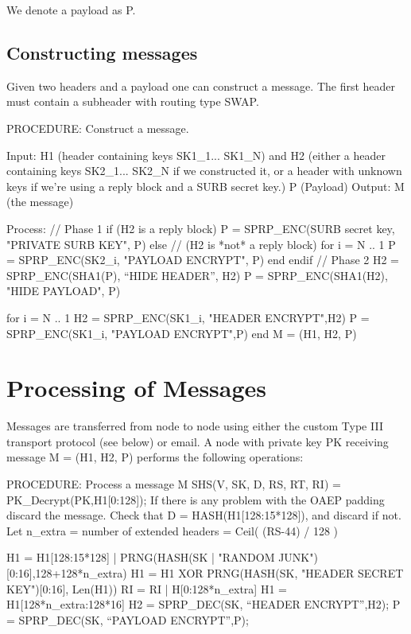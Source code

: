 We denote a payload as P.

\subsection{Constructing messages}

Given two headers and a payload one can construct a
message. The first header must contain a subheader
with routing type SWAP.  

PROCEDURE: Construct a message.

Input: H1 (header containing keys SK1_1... SK1_N)
       and H2 (either a header containing keys SK2_1... SK2_N if
         we constructed it, or a header with unknown keys if we're
         using a reply block and a SURB secret key.)
       P (Payload)
Output: M (the message)

Process:
        // Phase 1
        if (H2 is a reply block)
                P = SPRP_ENC(SURB secret key, "PRIVATE SURB KEY", P)
	else // (H2 is *not* a reply block)
		for i = N .. 1
	            P = SPRP_ENC(SK2_i, "PAYLOAD ENCRYPT", P)
		end
        endif
	// Phase 2
	H2 = SPRP_ENC(SHA1(P), ``HIDE HEADER'', H2)
        P = SPRP_ENC(SHA1(H2), "HIDE PAYLOAD", P)

	for i = N .. 1
		H2 = SPRP_ENC(SK1_i, "HEADER ENCRYPT",H2)
		P = SPRP_ENC(SK1_i, "PAYLOAD ENCRYPT",P)
	end
	M = (H1, H2, P)

\section{Processing of Messages}

Messages are transferred from node to node using either the custom Type
III transport protocol (see below) or email.  A node with private key
PK receiving message M = (H1, H2, P) performs the following operations:

PROCEDURE: Process a message M
	SHS(V, SK, D, RS, RT, RI) = PK_Decrypt(PK,H1[0:128]);
        If there is any problem with the OAEP padding discard the message.
        Check that D = HASH(H1[128:15*128]), and discard if not.
        Let n_extra = number of extended headers = Ceil( (RS-44) / 128 )
                  
        H1 = H1[128:15*128] | PRNG(HASH(SK | "RANDOM 
                                               JUNK")[0:16],128+128*n_extra)
	H1 = H1 XOR PRNG(HASH(SK, "HEADER SECRET KEY")[0:16], Len(H1))
        RI = RI | H[0:128*n_extra]
        H1 = H1[128*n_extra:128*16]
	H2 = SPRP_DEC(SK, ``HEADER ENCRYPT'',H2);
	P = SPRP_DEC(SK, ``PAYLOAD ENCRYPT'',P);

